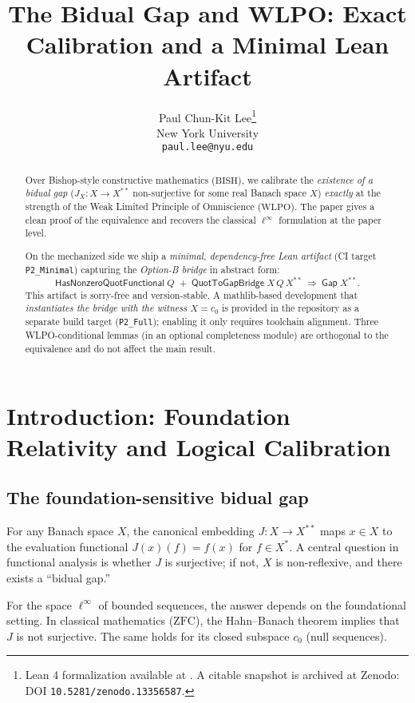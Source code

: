 \documentclass[11pt]{article}  %
\title{The Bidual Gap and WLPO: Exact Calibration and a Minimal Lean Artifact}
\author{Paul Chun-Kit Lee\thanks{Lean 4 formalization available at \leanRepo. A citable snapshot is archived at Zenodo: DOI \texttt{10.5281/zenodo.13356587}.} \\ New York University \\ \texttt{paul.lee@nyu.edu}}
\date{}
\newcommand{\linf}{\ell^\infty}
\newcommand{\WLPO}{\mathrm{WLPO}}
\newcommand{\BISH}{\mathrm{BISH}}
\newcommand{\ZFC}{\mathrm{ZFC}}
\begin{document}
\begin{abstract}
Over Bishop-style constructive mathematics ($\BISH$), we calibrate the \emph{existence of a bidual gap}
($J_X:X\to X^{**}$ non-surjective for some real Banach space $X$) \emph{exactly} at the strength of
the Weak Limited Principle of Omniscience ($\WLPO$).  The paper gives a clean proof of the equivalence and
recovers the classical $\ell^\infty$ formulation at the paper level.

On the mechanized side we ship a \emph{minimal, dependency-free Lean artifact} (CI target \texttt{P2\_Minimal})
capturing the \emph{Option-B bridge} in abstract form:
\[
\textsf{HasNonzeroQuotFunctional}\;Q \;+\; \textsf{QuotToGapBridge}\;X\,Q\,X^{**}\ \Longrightarrow\ \textsf{Gap}\;X^{**}.
\]
This artifact is sorry-free and version-stable.  A mathlib-based development that \emph{instantiates the bridge with the witness $X=c_0$} is provided in the repository as a separate build target (\texttt{P2\_Full}); enabling it only requires toolchain alignment.  Three WLPO-conditional lemmas (in an optional completeness module) are orthogonal to the equivalence and do not affect the main result.
\end{abstract}

\maketitle

\tableofcontents

\section{Introduction: Foundation Relativity and Logical Calibration}

\subsection{The foundation-sensitive bidual gap}

For any Banach space $X$, the canonical embedding $J:X\to X^{**}$ maps $x\in X$ to the evaluation functional $J(x)(f)=f(x)$ for $f\in X^*$. A central question in functional analysis is whether $J$ is surjective; if not, $X$ is non-reflexive, and there exists a ``bidual gap.''

For the space $\linf$ of bounded sequences, the answer depends on the foundational setting. In classical mathematics ($\ZFC$), the Hahn--Banach theorem implies that $J$ is not surjective. The same holds for its closed subspace $c_0$ (null sequences).
\end{document}
